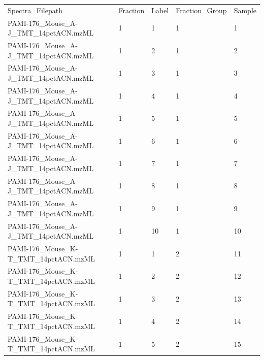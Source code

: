 \begin{table}[!ht]
\centering
\small
\begin{tabular}{lllll}
Spectra\_Filepath                         & Fraction           & Label                 & Fraction\_Group  & Sample    \\
PAMI-176\_Mouse\_A-J\_TMT\_14pctACN.mzML  & 1                  & 1                     & 1                & 1         \\
PAMI-176\_Mouse\_A-J\_TMT\_14pctACN.mzML  & 1                  & 2                     & 1                & 2         \\
PAMI-176\_Mouse\_A-J\_TMT\_14pctACN.mzML  & 1                  & 3                     & 1                & 3         \\
PAMI-176\_Mouse\_A-J\_TMT\_14pctACN.mzML  & 1                  & 4                     & 1                & 4         \\
PAMI-176\_Mouse\_A-J\_TMT\_14pctACN.mzML  & 1                  & 5                     & 1                & 5         \\
PAMI-176\_Mouse\_A-J\_TMT\_14pctACN.mzML  & 1                  & 6                     & 1                & 6         \\
PAMI-176\_Mouse\_A-J\_TMT\_14pctACN.mzML  & 1                  & 7                     & 1                & 7         \\
PAMI-176\_Mouse\_A-J\_TMT\_14pctACN.mzML  & 1                  & 8                     & 1                & 8         \\
PAMI-176\_Mouse\_A-J\_TMT\_14pctACN.mzML  & 1                  & 9                     & 1                & 9         \\
PAMI-176\_Mouse\_A-J\_TMT\_14pctACN.mzML  & 1                  & 10                    & 1                & 10        \\
PAMI-176\_Mouse\_K-T\_TMT\_14pctACN.mzML  & 1                  & 1                     & 2                & 11        \\
PAMI-176\_Mouse\_K-T\_TMT\_14pctACN.mzML  & 1                  & 2                     & 2                & 12        \\
PAMI-176\_Mouse\_K-T\_TMT\_14pctACN.mzML  & 1                  & 3                     & 2                & 13        \\
PAMI-176\_Mouse\_K-T\_TMT\_14pctACN.mzML  & 1                  & 4                     & 2                & 14        \\
PAMI-176\_Mouse\_K-T\_TMT\_14pctACN.mzML  & 1                  & 5                     & 2                & 15        \\

\end{tabular}
\end{table}
